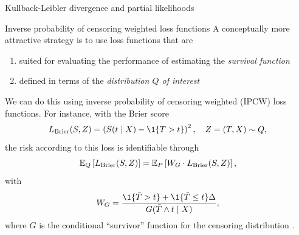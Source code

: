 \documentclass[smaller]{beamer}\usepackage{listings}
\begin{document}
\begin{frame}[label={sec:orgf097ea3}]{Kullback-Leibler divergence and partial likelihoods}
\begin{onlyenv}
\vfill

\end{onlyenv}
\end{frame}


\begin{frame}[label={sec:org5967bcd}]{Inverse probability of censoring weighted loss functions}
\small A conceptually more attractive strategy is to use loss functions that are
\begin{enumerate}[{(i)}]
\item suited for evaluating the performance of estimating the \emph{survival function}
\item defined in terms of the \emph{distribution \(Q\) of interest}
\end{enumerate}

\vfill

We can do this using inverse probability of censoring weighted (IPCW) loss functions. For instance,
with the Brier score
\begin{equation*}
  L_{\mathrm{Brier}}(S, Z) = 
  \left(
    S(t \mid X) - \1
    {\left\{
        T > t
      \right\}}
  \right)^2,
  \quad Z = (T, X) \sim Q,
\end{equation*}
the risk according to this loss is identifiable through
\begin{equation*}
  \operatorname{\mathbb{E}}_Q\left[ L_{\mathrm{Brier}}(S, Z) \right]
  = \operatorname{\mathbb{E}}_P\left[W_G \cdot L_{\mathrm{Brier}}(S, Z) \right],
\end{equation*}
with
\begin{equation*}
  W_G = \frac{\1{\{\tilde T > t\}} + \1{\{\tilde T \leq t\}}\Delta}{G(\tilde T \wedge t \mid X)},
\end{equation*}
where \(G\) is the conditional ``survivor'' function for the censoring distribution
\citep{graf1999assessment,gerds2006consistent,van2003unicv}.
\end{frame}
\end{document}
